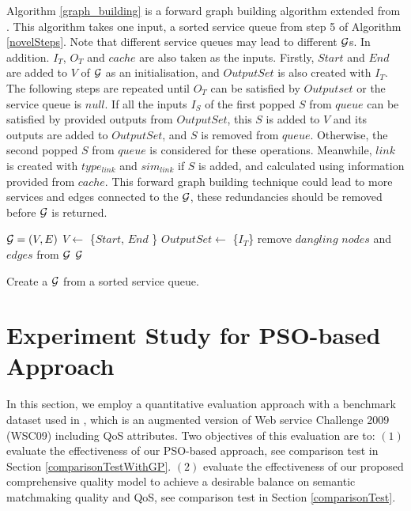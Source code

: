 Algorithm  \ref{graph_building} is a forward graph building algorithm extended from \cite{blum1997fast}. This algorithm takes one input, a sorted service queue from step 5 of Algorithm \ref{novelSteps}. Note that different service queues may lead to different $\gra$s. In addition. $I_{T}$, $O_{T}$ and $cache$ are also taken as the inputs. Firstly, $Start$ and $End$ are added to $V$ of $\gra$ as an initialisation, and $OutputSet$ is also created with $I_{T}$. The following steps are repeated until $O_{T}$ can be satisfied by $Outputset$ or the service queue is $null$. If all the inputs $I_{S}$ of the first popped  $S$ from $queue$ can be satisfied by provided outputs from $OutputSet$, this $S$ is added to $V$ and its outputs are added to $OutputSet$, and $S$ is removed from $queue$. Otherwise, the second popped  $S$ from $queue$ is considered for these operations. Meanwhile, $link$ is created with $type_{link}$ and $sim_{link}$ if $S$ is added, and calculated using information provided from $cache$. This forward graph building technique could lead to more services and edges connected to the $\gra$, these redundancies should be removed before $\gra$ is returned.

\begin{algorithm}
 \SetNlSty{}{}{:}
 \Output{$\gra$}
 $\mathcal{G} = (V, E)$\;
 $V \leftarrow$ \{$Start$, $End$ \}\;
 $OutputSet \leftarrow$ \{$I_{T}$\}\;
 remove $dangling$ $nodes$ and $edges$ from $\gra$\; 
 \KwRet $\gra$\;
 \caption{Create a $\gra$ from a sorted service queue.}
\label{graph_building}
\end{algorithm} 

\section{Experiment Study for PSO-based Approach}\label{experiment_design}
In this section, we employ a quantitative evaluation approach with a benchmark dataset used in \cite{ma2015hybrid,da2016genetic}, which is an augmented version of Web service Challenge 2009 (WSC09) including QoS attributes. Two objectives of this evaluation are to: $(1)$ evaluate the effectiveness of our PSO-based approach, see comparison test in Section \ref{comparisonTestWithGP}. $(2)$ evaluate the effectiveness of our proposed comprehensive quality model to achieve a desirable balance on semantic matchmaking quality and QoS, see comparison test in Section \ref{comparisonTest}.

